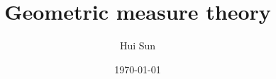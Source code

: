 \documentclass[lang=en,10pt, color=black]{../elegantbook}
\title{Geometric measure theory}
\author{Hui Sun}
\date{\today}
\begin{document}
\maketitle
\frontmatter
\newpage

\tableofcontents
\mainmatter


\newpage

\newpage

\newpage

\newpage

\newpage



\begin{comment}
    \section{Greetings}
    \label{sec:greetings}
    Hello!
    \section{Referencing}
    I greeted in section~\ref{sec:greetings}.
\end{comment}
\end{document}
